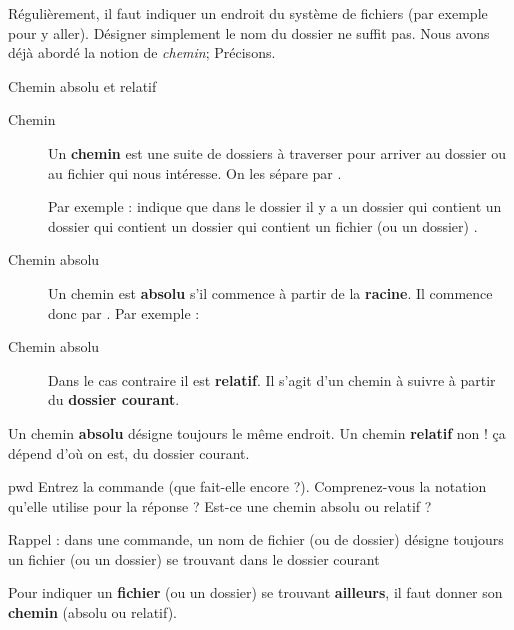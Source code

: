\documentclass[a4paper,11pt]{style-esi/td}
\begin{document}
		\bigskip
		Régulièrement, il faut indiquer un endroit du système de fichiers 
		(par exemple pour y aller). 
		Désigner simplement le nom du dossier ne suffit pas.  
		Nous avons déjà abordé la notion de \emph{chemin}; Précisons.

		\begin{theorie}{Chemin absolu et relatif}
			\begin{description}
			\item[Chemin]
				Un \textbf{chemin} est une suite de dossiers à traverser 
				pour arriver au dossier ou au fichier qui nous intéresse.
				On les sépare par \og{}\samp{/}\fg{}.

				Par exemple : 
				indique que dans le dossier 
				il y a un dossier 
				qui contient un dossier  
				qui contient un dossier  
				qui contient un fichier (ou un dossier) .
			\item[Chemin absolu]
				Un chemin est \textbf{absolu} 
				s'il commence à partir de la \textbf{racine}.
				Il commence donc par \og{}\samp{/}\fg{}.
				Par exemple : 
			\item[Chemin absolu]
				Dans le cas contraire il est \textbf{relatif}.
				Il s'agit d'un chemin à suivre à partir du \textbf{dossier courant}.
			\end{description}
		\end{theorie}

		\begin{alertbox}
			Un chemin \textbf{absolu} désigne toujours le même endroit.
			Un chemin \textbf{relatif} non ! \c ca dépend d'où on est,
			du dossier courant.
		\end{alertbox}

		\begin{Exercice}{pwd}
			Entrez la commande  (que fait-elle encore ?). 
			Comprenez-vous la notation qu'elle utilise pour la réponse ?
			Est-ce une chemin absolu ou relatif ?
		\end{Exercice}

		\begin{infobox}
			Rappel : dans une commande, un nom de fichier (ou de dossier)
			désigne toujours un fichier (ou un dossier) se trouvant
			dans le dossier courant
	
			Pour indiquer un \textbf{fichier} (ou un dossier) 
			se trouvant \textbf{ailleurs},
			il faut donner son \textbf{chemin} (absolu ou relatif).
		\end{infobox}
\end{document}
